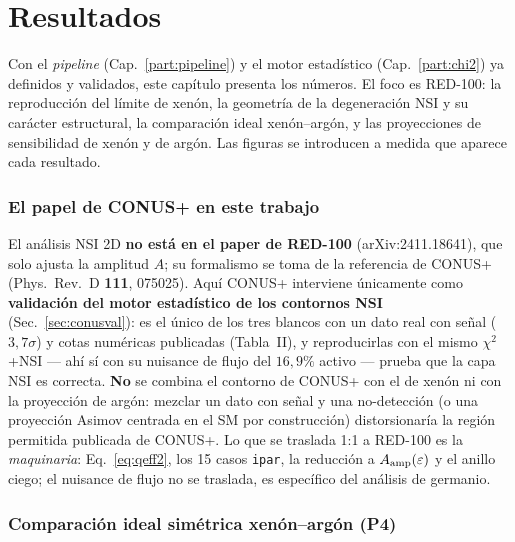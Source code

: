 \documentclass[11pt,a4paper]{article}
\newcommand{\eps}{\varepsilon}
\newcommand{\Aamp}{A_{\rm amp}}
\newcommand{\code}[1]{\texttt{#1}}
\begin{document}
\part{Resultados}
\label{part:resultados}

Con el \emph{pipeline} (Cap.~\ref{part:pipeline}) y el motor estad\'istico
(Cap.~\ref{part:chi2}) ya definidos y validados, este cap\'itulo presenta los
n\'umeros. El foco es RED-100: la reproducci\'on del l\'imite de xen\'on, la
geometr\'ia de la degeneraci\'on NSI y su car\'acter estructural, la comparaci\'on
ideal xen\'on--arg\'on, y las proyecciones de sensibilidad de xen\'on y de
arg\'on. Las figuras se introducen a medida que aparece cada resultado.

\section{El papel de CONUS+ en este trabajo}
\label{sec:conus}

El an\'alisis NSI 2D \textbf{no est\'a en el paper de RED-100}
(arXiv:2411.18641), que solo ajusta la amplitud $A$; su formalismo se toma de la
referencia de CONUS+ (Phys.\ Rev.\ D \textbf{111}, 075025). Aqu\'i CONUS+
interviene \'unicamente como \textbf{validaci\'on del motor estad\'istico de los
contornos NSI} (Sec.~\ref{sec:conusval}): es el \'unico de los tres blancos con
un dato real con se\~nal ($3{,}7\sigma$) y cotas num\'ericas publicadas
(Tabla~II), y reproducirlas con el mismo $\chi^{2}$+NSI --- ah\'i s\'i con su
nuisance de flujo del $16{,}9\%$ activo --- prueba que la capa NSI es correcta.
\textbf{No} se combina el contorno de CONUS+ con el de xen\'on ni con la
proyecci\'on de arg\'on: mezclar un dato con se\~nal y una no-detecci\'on (o una
proyecci\'on Asimov centrada en el SM por construcci\'on) distorsionar\'ia la
regi\'on permitida publicada de CONUS+. Lo que se traslada 1:1 a RED-100 es la
\emph{maquinaria}: Eq.~\eqref{eq:qeff2}, los 15 casos \code{ipar}, la reducci\'on
a $\Aamp(\eps)$ y el anillo ciego; el nuisance de flujo no se traslada, es
espec\'ifico del an\'alisis de germanio.

\section{Comparaci\'on ideal sim\'etrica xen\'on--arg\'on (P4)}
\label{sec:ideal}
\end{document}
